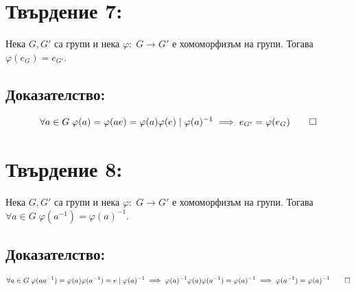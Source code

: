 \documentclass{article}
\begin{document}
\section*{Твърдение 7:}
Нека $G, G'$ са групи и нека $\varphi : \; G \to G'$ е хомоморфизъм на групи. Тогава $\varphi(e_G) = e_{G'}$.

\subsection*{Доказателство:}
\begin{align*}
	\forall a \in G \; \varphi(a) = \varphi(ae) = \varphi(a)\varphi(e) \; | \; \varphi(a)^{-1} \implies e_{G'} = \varphi(e_G) \qed
\end{align*}

\section*{Твърдение 8:}
Нека $G, G'$ са групи и нека $\varphi : \; G \to G'$ е хомоморфизъм на групи. Тогава $\forall a \in G \; \varphi(a^{-1}) = \varphi(a)^{-1}$.

\subsection*{Доказателство:}
\begin{align*}
	\forall a \in G \; \varphi(aa^{-1}) = \varphi(a)\varphi(a^{-1}) = e \; | \; \varphi(a)^{-1} \implies \varphi(a)^{-1}\varphi(a)\varphi(a^{-1}) =\varphi(a)^{-1}
	\implies \varphi(a^{-1}) = \varphi(a)^{-1}  \qed
\end{align*}
\end{document}

